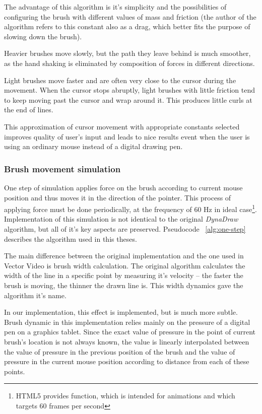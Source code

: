 The advantage of this algorithm is it's simplicity and the possibilities of configuring the brush with different values of mass and friction (the author of the algorithm refers to this constant also as a drag, which better fits the purpose of slowing down the brush).

Heavier brushes move slowly, but the path they leave behind is much smoother, as the hand shaking is eliminated by composition of forces in different directions.

Light brushes move faster and are often very close to the cursor during the movement. When the cursor stops abruptly, light brushes with little friction tend to keep moving past the cursor and wrap around it. This produces little curls at the end of lines.

This approximation of cursor movement with appropriate constants selected improves quality of user's input and leads to nice results event when the user is using an ordinary mouse instead of a digital drawing pen.

\subsubsection*{Brush movement simulation}

One step of simulation applies force on the brush according to current mouse position and thus moves it in the direction of the pointer. This process of applying force must be  done periodically, at the frequency of 60 Hz in ideal case\footnote{HTML5 provides  function, which is intended for animations and which targets 60 frames per second}. Implementation of this simulation is not identical to the original \textit{DynaDraw} algorithm, but all of it's key aspects are preserved. Pseudocode ~\ref{alg:one-step} describes the algorithm used in this theses.

The main difference between the original implementation and the one used in Vector Video is brush width calculation. The original algorithm calculates the width of the line in a specific point by measuring it's velocity -- the faster the brush is moving, the thinner the drawn line is. This width dynamics gave the algorithm it's name.

In our implementation, this effect is implemented, but is much more subtle. Brush dynamic in this implementation relies mainly on the pressure of a digital pen on a graphics tablet. Since the exact value of pressure in the point of current brush's location is not always known, the value is linearly interpolated between the value of pressure in the previous position of the brush and the value of pressure in the current mouse position according to distance from each of these points.

